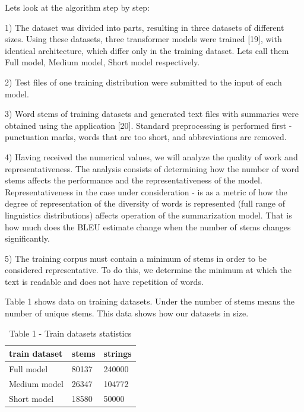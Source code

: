 \begin{multicols}{2}
Let\textquotesingle s look at the algorithm step by step:

1) The dataset was divided into parts, resulting in three datasets of
different sizes. Using these datasets, three transformer models were
trained {[}19{]}, with identical architecture, which differ only in the
training dataset. Let\textquotesingle s call them Full model, Medium
model, Short model respectively.

2) Test files of one training distribution were submitted to the input
of each model.

3) Word stems of training datasets and generated text files with
summaries were obtained using the application {[}20{]}. Standard
preprocessing is performed first - punctuation marks, words that are too
short, and abbreviations are removed.

4) Having received the numerical values, we will analyze the quality of
work and representativeness. The analysis consists of determining how
the number of word stems affects the performance and the
representativeness of the model. Representativeness in the case under
consideration - is as a metric of how the degree of representation of
the diversity of words is represented (full range of linguistics
distributions) affects operation of the summarization model. That is how
much does the BLEU estimate change when the number of stems changes
significantly.

5) The training corpus must contain a minimum of stems in order to be
considered representative. To do this, we determine the minimum at which
the text is readable and does not have repetition of words. \hl{}

Table 1 shows data on training datasets. Under the number of stems means
the number of unique stems. This data shows how our datasets in size.

\begin{table}[H]
\caption*{Table 1 - Train datasets statistics}
\centering
\begin{tabular}{|l|l|l|}
\hline
train dataset & stems & strings \\ \hline
Full model & 80137 & 240000 \\ \hline
Medium model & 26347 & 104772 \\ \hline
Short model & 18580 & 50000 \\ \hline
\end{tabular}
\end{table}


\end{multicols}
